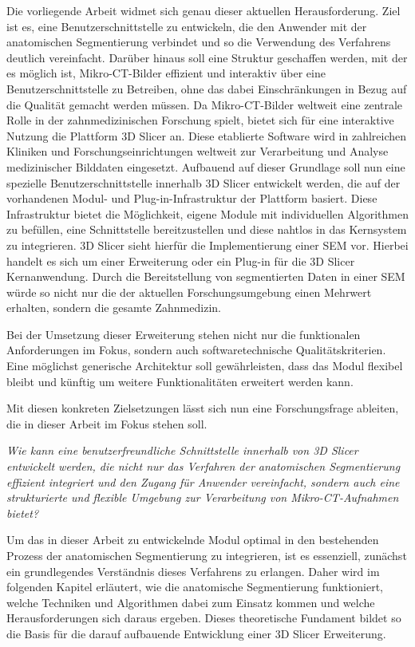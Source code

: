Die vorliegende Arbeit widmet sich genau dieser aktuellen Herausforderung. Ziel ist
es, eine Benutzerschnittstelle zu entwickeln, die den Anwender mit der anatomischen
Segmentierung verbindet und so die Verwendung des Verfahrens deutlich vereinfacht.
Darüber hinaus soll eine Struktur geschaffen werden, mit der es möglich ist,
Mikro-\ac{CT}-Bilder effizient und interaktiv über eine Benutzerschnittstelle zu
Betreiben, ohne das dabei Einschränkungen in Bezug auf die Qualität gemacht
werden müssen. Da Mikro-\ac{CT}-Bilder weltweit eine zentrale Rolle in der
zahnmedizinischen Forschung spielt, bietet sich für eine interaktive Nutzung die
Plattform 3D Slicer an. Diese etablierte Software wird in zahlreichen Kliniken
und Forschungseinrichtungen weltweit zur Verarbeitung und Analyse medizinischer
Bilddaten eingesetzt. Aufbauend auf dieser Grundlage soll nun eine spezielle Benutzerschnittstelle
innerhalb 3D Slicer entwickelt werden, die auf der vorhandenen Modul- und Plug-in-Infrastruktur
der Plattform basiert. Diese Infrastruktur bietet die Möglichkeit, eigene Module
mit individuellen Algorithmen zu befüllen, eine Schnittstelle bereitzustellen
und diese nahtlos in das Kernsystem zu integrieren. 3D Slicer sieht hierfür die Implementierung
einer \ac{SEM} vor. Hierbei handelt es sich um einer Erweiterung oder ein Plug-in
für die 3D Slicer Kernanwendung. Durch die Bereitstellung von segmentierten
Daten in einer \ac{SEM} würde so nicht nur die der aktuellen Forschungsumgebung einen
Mehrwert erhalten, sondern die gesamte Zahnmedizin.

Bei der Umsetzung dieser Erweiterung stehen nicht nur die funktionalen
Anforderungen im Fokus, sondern auch softwaretechnische Qualitätskriterien. Eine
möglichst generische Architektur soll gewährleisten, dass das Modul flexibel bleibt
und künftig um weitere Funktionalitäten erweitert werden kann.

Mit diesen konkreten Zielsetzungen lässt sich nun eine Forschungsfrage ableiten,
die in dieser Arbeit im Fokus stehen soll.

\begin{center}
	\textit{Wie kann eine benutzerfreundliche Schnittstelle innerhalb von 3D
	Slicer entwickelt werden, die nicht nur das Verfahren der anatomischen Segmentierung
	effizient integriert und den Zugang für Anwender vereinfacht, sondern auch
	eine strukturierte und flexible Umgebung zur Verarbeitung von Mikro-\ac{CT}-Aufnahmen
	bietet?}
\end{center}

Um das in dieser Arbeit zu entwickelnde Modul optimal in den bestehenden Prozess
der anatomischen Segmentierung zu integrieren, ist es essenziell, zunächst ein grundlegendes
Verständnis dieses Verfahrens zu erlangen. Daher wird im folgenden Kapitel
erläutert, wie die anatomische Segmentierung funktioniert, welche Techniken und
Algorithmen dabei zum Einsatz kommen und welche Herausforderungen sich daraus
ergeben. Dieses theoretische Fundament bildet so die Basis für die darauf aufbauende
Entwicklung einer 3D Slicer Erweiterung.
